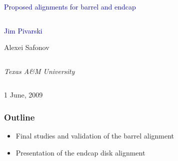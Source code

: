 \documentclass[compress]{beamer}
\begin{document}
\begin{frame}
\vfill
\begin{center}
\textcolor{darkblue}{\Large Proposed alignments for barrel and endcap}

\vfill
\begin{columns}
\begin{center}
\large
\textcolor{darkblue}{Jim Pivarski}

\vspace{0.2 cm}
Alexei Safonov
\end{center}
\end{columns}

\begin{columns}
\begin{center}
\scriptsize
{\it Texas A\&M University}
\end{center}
\end{columns}

\vfill
 1 June, 2009

\end{center}
\end{frame}


\small

\begin{frame}
\frametitle{Outline}
\begin{itemize}\setlength{\itemsep}{0.75 cm}
\item Final studies and validation of the barrel alignment
\item Presentation of the endcap disk alignment
\end{itemize}
\end{frame}
\end{document}
